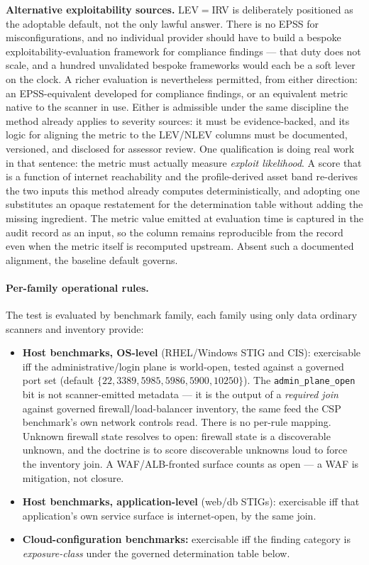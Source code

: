 \documentclass[11pt]{article}
\newcommand{\code}[1]{\texttt{#1}}
\begin{document}
\begin{definitionbox}
\textbf{Alternative exploitability sources.} LEV${}={}$IRV is deliberately positioned
as the adoptable default, not the only lawful answer. There is no EPSS for
misconfigurations, and no individual provider should have to build a bespoke
exploitability-evaluation framework for compliance findings --- that duty does not
scale, and a hundred unvalidated bespoke frameworks would each be a soft lever on the
clock. A richer evaluation is nevertheless permitted, from either direction: an
EPSS-equivalent developed for compliance findings, or an equivalent metric native to
the scanner in use. Either is admissible under the same discipline the method already
applies to severity sources: it must be evidence-backed, and its logic for aligning
the metric to the LEV/NLEV columns must be documented, versioned, and disclosed for
assessor review. One qualification is doing real work in that sentence: the metric
must actually measure \emph{exploit likelihood}. A score that is a function of
internet reachability and the profile-derived asset band re-derives the two inputs this method already
computes deterministically, and adopting one substitutes an opaque restatement for
the determination table without adding the missing ingredient. The metric value
emitted at evaluation time is captured in the audit record as an input, so the column
remains reproducible from the record even when the metric itself is recomputed
upstream. Absent such a documented alignment, the baseline default governs.
\end{definitionbox}

\paragraph{Per-family operational rules.} The test is evaluated by benchmark family,
each family using only data ordinary scanners and inventory provide:

\begin{itemize}[leftmargin=1.4em,topsep=3pt]
\item \textbf{Host benchmarks, OS-level} (RHEL/Windows STIG and CIS): exercisable iff
  the administrative/login plane is world-open, tested against a governed port set
  (default $\{22, 3389, 5985, 5986, 5900, 10250\}$). The \code{admin\_plane\_open}
  bit is not scanner-emitted metadata --- it is the output of a \emph{required join}
  against governed firewall/load-balancer inventory, the same feed the CSP
  benchmark's own network controls read. There is no per-rule mapping. Unknown
  firewall state resolves to open: firewall state is a discoverable unknown, and the
  doctrine is to score discoverable unknowns loud to force the inventory join. A
  WAF/ALB-fronted surface counts as open --- a WAF is mitigation, not closure.
\item \textbf{Host benchmarks, application-level} (web/db STIGs): exercisable iff that
  application's own service surface is internet-open, by the same join.
\item \textbf{Cloud-configuration benchmarks:} exercisable iff the finding category is
  \emph{exposure-class} under the governed determination table below.
\end{itemize}
\end{document}
